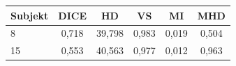 \begin{tabular}{l c c c c c}
 \hline
Subjekt & DICE & HD & VS & MI & MHD \\ \hline
8 & 0,718 & 39,798 & 0,983 & 0,019 & 0,504 \\
15 & 0,553 & 40,563 & 0,977 & 0,012 & 0,963 \\
\hline 
 \end{tabular}
